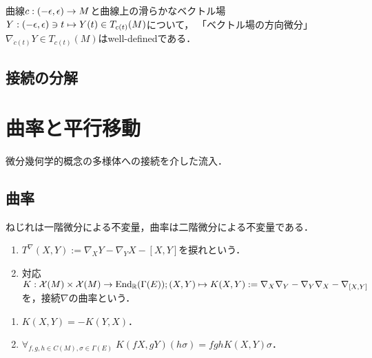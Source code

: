 \documentclass[uplatex,dvipdfmx]{jsreport}
\begin{document}
\begin{corollary}
    曲線$c:(-\epsilon,\epsilon)\to M$と曲線上の滑らかなベクトル場$Y:(-\epsilon,\epsilon)\ni t\mapsto Y(t)\in T_{c(t)}(M)$について，
    「ベクトル場の方向微分」$\nabla_{\dot{c}(t)}Y\in T_{c(t)}(M)$はwell-definedである．
\end{corollary}

\subsection{接続の分解}

\section{曲率と平行移動}

\begin{tcolorbox}[colframe=ForestGreen, colback=ForestGreen!10!white,breakable,colbacktitle=ForestGreen!40!white,coltitle=black,fonttitle=\bfseries\sffamily,
title=]
    微分幾何学的概念の多様体への接続を介した流入．
\end{tcolorbox}

\subsection{曲率}

\begin{tcolorbox}[colframe=ForestGreen, colback=ForestGreen!10!white,breakable,colbacktitle=ForestGreen!40!white,coltitle=black,fonttitle=\bfseries\sffamily,
title=]
    ねじれは一階微分による不変量，曲率は二階微分による不変量である．
\end{tcolorbox}

\begin{definition}\mbox{}
    \begin{enumerate}
        \item $T^\nabla(X,Y):=\nabla_XY-\nabla_YX-[X,Y]$を捩れという．
        \item 対応$K:\mathcal{X}(M)\times\mathcal{X}(M)\to\mathrm{End}_{\mathbb{R}}(\Gamma(E));(X,Y)\mapsto K(X,Y):=\nabla_X\nabla_Y-\nabla_Y\nabla_X-\nabla_{[X,Y]}$を，接続$\nabla$の曲率という．
    \end{enumerate}
\end{definition}

\begin{theorem}\mbox{}
    \begin{enumerate}
        \item $K(X,Y)=-K(Y,X)$．
        \item $\forall_{f,g,h\in C(M),\sigma\in\Gamma(E)}\;K(fX,gY)(h\sigma)=fghK(X,Y)\sigma$．
    \end{enumerate}
\end{theorem}
\end{document}
